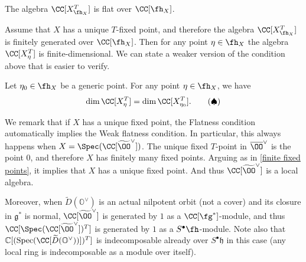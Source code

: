 \documentclass[12pt]{amsart}
\begin{document}
\begin{flat*}
    The algebra $\CC[X_{\fh_X}^T]$ is flat over $\CC[\fh_X]$.
\end{flat*}

Assume that $X$ has a unique $T$-fixed point, and therefore the algebra $\CC[X_{\fh_X}^T]$ is finitely generated over $\CC[\fh_X]$. Then for any point $\eta\in \fh_X$ the algebra $\CC[X_{\eta}^T]$ is finite-dimensional. We can state a weaker version of the condition above that is easier to verify.

\begin{weakflatt*}
     Let $\eta_0\in \fh_X$ be a generic point. For any point $\eta\in \fh_X$, we have
     \begin{equation} \label{weakflat}
         \dim \CC[X_{\eta}^T] = \dim \CC[X_{\eta_0}^T].\tag{$\spadesuit$}
     \end{equation}
\end{weakflatt*}

We remark that if $X$ has a unique fixed point, the Flatness condition automatically implies the Weak flatness condition. In particular, this always happens when $X=\Spec({\CC}[\widetilde{\OO}^\vee])$. The unique fixed $T$-point in $\overline{\OO}^\vee$ is the point $0$, and therefore $X$ has finitely many fixed points. Arguing as in \cref{finite fixed points}, it implies that $X$ has a unique fixed point. And thus ${\CC}[\widetilde{\OO}^\vee]$ is a local algebra.

Moreover, when $\widetilde{D}({\mathbb{O}}^\vee)$ is an actual nilpotent orbit (not a cover) and its closure in $\mathfrak{g}^*$ is normal, ${\CC}[\widetilde{\OO}^\vee]$ is generated by $1$ as a $\CC[\fg^*]$-module, and thus $\CC[\Spec({\CC}[\widetilde{\OO}^\vee])^T]$ is generated by $1$ as a $S^\bullet\fh$-module. Note also that $\mathbb{C}[(\operatorname{Spec}(\CC[\widetilde{D}(\mathbb{O}^\vee))])^{T}]$ is indecomposable already over $S^\bullet \mathfrak{h}$ in this case (any local ring is indecomposable as a module over itself).
\end{document}
